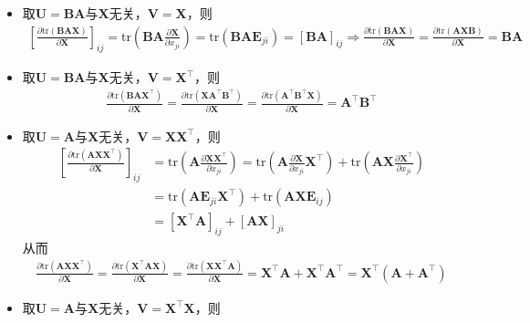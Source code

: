 \documentclass{ctexart}
\theoremstyle{definition}
\def \Av {\mathbf{A}}
\def \Bv {\mathbf{B}}
\def \Ev {\mathbf{E}}
\def \Uv {\mathbf{U}}
\def \Vv {\mathbf{V}}
\def \Xv {\mathbf{X}}
\def \tr {\mathrm{tr}}
\begin{document}
\begin{itemize}
    \item 取$\Uv = \Bv \Av$与$\Xv$无关，$\Vv = \Xv$，则
          \begin{align*}
              \left[ \frac{\partial \tr(\Bv \Av \Xv)}{\partial \Xv} \right]_{ij} = \tr \left( \Bv \Av \frac{\partial \Xv}{\partial x_{ji}} \right) = \tr ( \Bv \Av \Ev_{ji} ) = [\Bv \Av]_{ij} \Longrightarrow \frac{\partial \tr(\Bv \Av \Xv)}{\partial \Xv} = \frac{\partial \tr(\Av \Xv \Bv)}{\partial \Xv} = \Bv \Av
          \end{align*}
    \item 取$\Uv = \Bv \Av$与$\Xv$无关，$\Vv = \Xv^\top$，则
          \begin{align*}
              \frac{\partial \tr(\Bv \Av \Xv^\top)}{\partial \Xv} = \frac{\partial \tr(\Xv \Av^\top \Bv^\top)}{\partial \Xv} = \frac{\partial \tr(\Av^\top \Bv^\top \Xv)}{\partial \Xv} = \Av^\top \Bv^\top
          \end{align*}
    \item 取$\Uv = \Av$与$\Xv$无关，$\Vv = \Xv \Xv^\top$，则
          \begin{align*}
              \left[ \frac{\partial \tr(\Av \Xv \Xv^\top)}{\partial \Xv} \right]_{ij} & = \tr \left( \Av \frac{\partial \Xv \Xv^\top}{\partial x_{ji}} \right) = \tr \left( \Av \frac{\partial \Xv}{\partial x_{ji}} \Xv^\top \right) + \tr \left( \Av \Xv \frac{\partial \Xv^\top}{\partial x_{ji}} \right) \\
                                                                                      & = \tr(\Av \Ev_{ji} \Xv^\top) + \tr(\Av \Xv \Ev_{ij})                                                                                                                                                                 \\
                                                                                      & = [\Xv^\top \Av]_{ij} + [\Av \Xv]_{ji}
          \end{align*}
          从而
          \begin{align*}
              \frac{\partial \tr(\Av \Xv \Xv^\top)}{\partial \Xv} = \frac{\partial \tr(\Xv^\top \Av \Xv)}{\partial \Xv} = \frac{\partial \tr(\Xv \Xv^\top \Av)}{\partial \Xv} = \Xv^\top \Av + \Xv^\top \Av^\top = \Xv^\top (\Av + \Av^\top)
          \end{align*}
    \item 取$\Uv = \Av$与$\Xv$无关，$\Vv = \Xv^\top \Xv$，则
          \begin{align*}

\end{align*}
\end{itemize}
\end{document}
